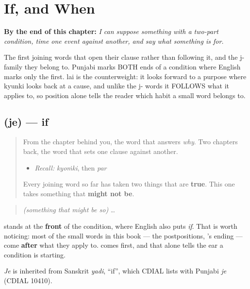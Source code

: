 
\chapter{If, and When}
\label{ch:pa-if-and-when}

\begin{chapteropening}
\textbf{By the end of this chapter:} \emph{I can suppose something with a two-part condition, time one event against another, and say what something is for.}

The first joining words that open their clause rather than following it, and the j- family they belong to. Punjabi marks BOTH ends of a condition where English marks only the first. lai is the counterweight: it looks forward to a purpose where kyunki looks back at a cause, and unlike the j- words it FOLLOWS what it applies to, so position alone tells the reader which habit a small word belongs to.
\end{chapteropening}

\section[\texorpdfstring{\pa{ਜੇ} (je)}{ਜੇ (je)}]{ (je) — if}

\label{lesson:PA-C41-je}



\begin{quote}
From the chapter behind you, the word that answers \emph{why}. Two chapters back, the word that sets one clause against another.

\begin{itemize}
\raggedright
  \item \emph{Recall:} \emph{kyoṁki}, then \emph{par}
\end{itemize}

Every joining word so far has taken two things that are \textbf{true}. This one takes something that \textbf{might not be}.
\end{quote}

\begin{cousinweb}
\begin{quote}
\textbf{} \emph{(something that might be so)} …
\end{quote}

\textbf{} stands at the \textbf{front} of the condition, where English also puts \emph{if}. That is worth noticing: most of the small words in this book — the postpositions, \textbf{}'s ending — come \textbf{after} what they apply to. \textbf{} comes first, and that alone tells the ear a condition is starting.

\emph{Je} is inherited from Sanskrit \emph{yadi}, \textquotedblleft{}if\textquotedblright{}, which CDIAL lists with Punjabi \emph{je} (CDIAL 10410).
\end{cousinweb}

